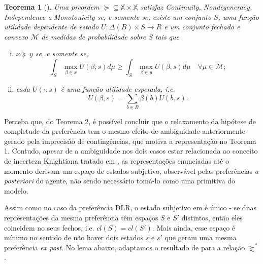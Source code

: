 \documentclass[11pt, a4paper]{article}
\theoremstyle{nonumberplain}
\theoremstyle{plain}
\newtheorem{theorem}{Teorema}
\theoremstyle{plain}
\theoremstyle{plain}
\begin{document}
\begin{theorem}[\cite{Kochov2007}]\label{kochov} Uma preordem $\succcurlyeq\subseteq\mathbb{X}\times\mathbb{X}$ satisfaz \emph{Continuity}, \emph{Nondegeneracy}, \emph{Independence} e \emph{Monotonicity} se, e somente se, existe um conjunto $S$, uma função utilidade dependente de estado $U:\Delta(B)\times S\rightarrow R$ e um conjunto fechado e convexo $\mathcal{M}$ de medidas de probabilidade sobre $S$ tais que
\begin{enumerate}[(i)]
\item $x\succcurlyeq y$ se, e somente se, $$ \int_{S} \max_{\beta\in x}U(\beta,s)d\mu \geq \int_{S} \max_{\beta\in y}U(\beta,s)d\mu\quad \forall\mu\in\mathcal{M};$$
\item cada $U(\cdot,s)$ é uma função utilidade esperada, i.e. $$U(\beta,s)=\sum_{b\in B} \beta(b)U(b,s).$$
\end{enumerate} 
\end{theorem}

Perceba que, do Teorema 2, é possível concluir que o relaxamento da hipótese de completude da preferência tem o mesmo efeito de ambiguidade anteriormente gerado pela imprecisão de contingências, que motiva a representação no Teorema 1. Contudo, apesar de a ambiguidade nos dois casos estar relacionada ao conceito de incerteza Knightiana tratado em \cite{Bewley1986a}, as representações enunciadas até o momento derivam um espaço de estados subjetivo, observável pelas preferências \emph{a posteriori} do agente, não sendo necessário tomá-lo como uma primitiva do modelo.  

Assim como no caso da preferência DLR, o estado subjetivo em \cite{Kochov2007} é único - se duas representações da mesma preferência têm espaços $S$ e $S'$ distintos, então eles coincidem no seus fechos, i.e. $cl(S)=cl(S')$. Mais ainda, esse espaço é mínimo no sentido de não haver dois estados $s$ e $s'$ que geram uma mesma preferência \emph{ex post}. No lema abaixo, adaptamos o resultado de \cite{Kochov2007} para a relação $\succsim^*$. 
\end{document}
